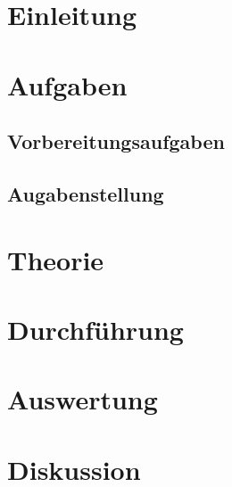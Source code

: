 



  \section{Einleitung}
  
  
  
  \section{Aufgaben}
  
  
  
    \subsection{Vorbereitungsaufgaben}
    
    
    
    \subsection{Augabenstellung}
    
    
    
  \section{Theorie}
  
  
  
  \section{Durchführung}
  
  
  
  \section{Auswertung}
  
  
  
  \section{Diskussion}
  
  



